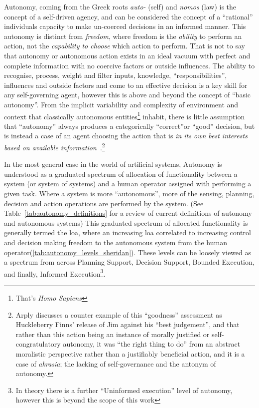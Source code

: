 Autonomy, coming from the Greek roots \textit{auto-} (self) and \textit{nomos} (law) is the concept of a self-driven agency, and can be considered the concept of a ``rational'' individuals capacity to make un-coerced decisions in an informed manner. 
This autonomy is distinct from \textit{freedom}, where freedom is the \textit{ability} to perform an action, not the \textit{capability to choose} which action to perform.
That is not to say that autonomy or autonomous action exists in an ideal vacuum with perfect and complete information with no coercive factors or outside influences.
The ability to recognise, process, weight and filter inputs, knowledge, ``responsibilities'', influences and outside factors and come to an effective decision is a key skill for any self-governing agent, however this is above and beyond the concept of ``basic autonomy''.
From the implicit variability and complexity of environment and context that classically autonomous entities\footnote{That's \textit{Homo Sapiens}} inhabit, there is little assumption that ``autonomy'' always produces a categorically ``correct''or ``good'' decision, but is instead a case of an agent choosing the action that is \textit{in its own best interests based on available information}~\cite{Arpaly2003}.\footnote{Arply discusses a counter example of this ``goodness'' assessment as  Huckleberry Finns' release of Jim against his ``best judgement'', and that rather than this action being an instance of morally justified or self-congratulatory autonomy, it was ``the right thing to do'' from an abstract moralistic perspective rather than a justifiably beneficial action, and it is a case of \textit{akrasia}; the lacking of self-governance and the antonym of autonomy.}

In the most general case in the world of artificial systems, Autonomy is understood as a graduated spectrum of allocation of functionality between a system (or system of systems) and a human operator assigned with performing a given task. 
Where a system is more ``autonomous'', more of the sensing, planning, decision and action operations are performed by the system. (See Table~\ref{tab:autonomy_definitions} for a review of current definitions of autonomy and autonomous systems)
This graduated spectrum of allocated functionality is generally termed the \acrfull{loa}, where an increasing \gls{loa} correlated to increasing control and decision making freedom to the autonomous system from the human operator(\autoref{tab:autonomy_levels_sheridan}).
These levels can be loosely viewed as a spectrum from across Planning Support, Decision Support, Bounded Execution, and finally, Informed Execution\footnote{In theory there is a further ``Uninformed execution'' level of autonomy, however this is beyond the scope of this work\cite{Cameron1984}}.

